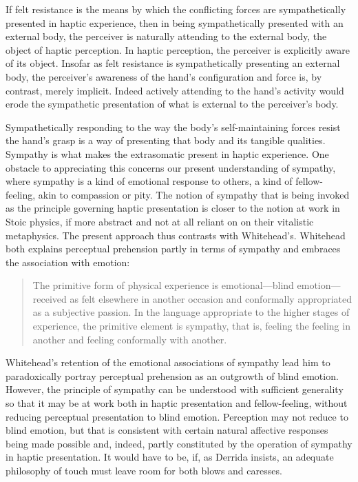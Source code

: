 \documentclass[12pt]{article}
\begin{document}
If felt resistance is the means by which the conflicting forces are sympathetically presented in haptic experience, then in being sympathetically presented with an external body, the perceiver is naturally attending to the external body, the object of haptic perception. In haptic perception, the perceiver is explicitly aware of its object. Insofar as felt resistance is sympathetically presenting an external body, the perceiver's awareness of the hand's configuration and force is, by contrast, merely implicit. Indeed actively attending to the hand's activity would erode the sympathetic presentation of what is external to the perceiver's body. 

Sympathetically responding to the way the body's self-maintaining forces resist the hand's grasp is a way of presenting that body and its tangible qualities. Sympathy is what makes the extrasomatic present in haptic experience. One obstacle to appreciating this concerns our present understanding of sympathy, where sympathy is a kind of emotional response to others, a kind of fellow-feeling, akin to compassion or pity. The notion of sympathy that is being invoked as the principle governing haptic presentation is closer to the notion at work in Stoic physics, if more abstract and not at all reliant on on their vitalistic metaphysics. The present approach thus contrasts with Whitehead's. Whitehead both explains perceptual prehension partly in terms of sympathy and embraces the association with emotion:
\begin{quote}
	The primitive form of physical experience is emotional---blind emotion---received as felt elsewhere in another occasion and conformally appropriated as a subjective passion. In the language appropriate to the higher stages of experience, the primitive element is sympathy, that is, feeling the feeling in another and feeling conformally with another.
\end{quote}
Whitehead's retention of the emotional associations of sympathy lead him to paradoxically portray perceptual prehension as an outgrowth of blind emotion. However, the principle of sympathy can be understood with sufficient generality so that it may be at work both in haptic presentation and fellow-feeling, without reducing perceptual presentation to blind emotion. Perception may not reduce to blind emotion, but that is consistent with certain natural affective responses being made possible and, indeed, partly constituted by the operation of sympathy in haptic presentation. It would have to be, if, as Derrida insists, an adequate philosophy of touch must leave room for both blows and caresses.
\end{document}
